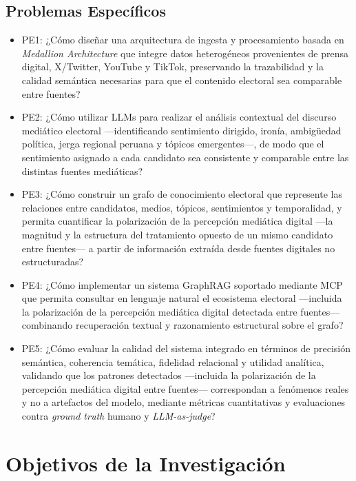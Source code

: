 \subsection{Problemas Específicos}

\newcommand{\Pbone}{¿Cómo diseñar una arquitectura de ingesta y procesamiento basada en \textit{Medallion Architecture} que integre datos heterogéneos provenientes de prensa digital, X/Twitter, YouTube y TikTok, preservando la trazabilidad y la calidad semántica necesarias para que el contenido electoral sea comparable entre fuentes?}
\newcommand{\Pbtwo}{¿Cómo utilizar LLMs para realizar el análisis contextual del discurso mediático electoral —identificando sentimiento dirigido, ironía, ambigüedad política, jerga regional peruana y tópicos emergentes—, de modo que el sentimiento asignado a cada candidato sea consistente y comparable entre las distintas fuentes mediáticas?}
\newcommand{\Pbthree}{¿Cómo construir un grafo de conocimiento electoral que represente las relaciones entre candidatos, medios, tópicos, sentimientos y temporalidad, y permita cuantificar la polarización de la percepción mediática digital —la magnitud y la estructura del tratamiento opuesto de un mismo candidato entre fuentes— a partir de información extraída desde fuentes digitales no estructuradas?}
\newcommand{\Pbfour}{¿Cómo implementar un sistema GraphRAG soportado mediante MCP que permita consultar en lenguaje natural el ecosistema electoral —incluida la polarización de la percepción mediática digital detectada entre fuentes— combinando recuperación textual y razonamiento estructural sobre el grafo?}
\newcommand{\Pbfive}{¿Cómo evaluar la calidad del sistema integrado en términos de precisión semántica, coherencia temática, fidelidad relacional y utilidad analítica, validando que los patrones detectados —incluida la polarización de la percepción mediática digital entre fuentes— correspondan a fenómenos reales y no a artefactos del modelo, mediante métricas cuantitativas y evaluaciones contra \textit{ground truth} humano y \textit{LLM-as-judge}?}

\begin{itemize}
	\item PE1: {\Pbone}
	\item PE2: {\Pbtwo}
	\item PE3: {\Pbthree}
	\item PE4: {\Pbfour}
	\item PE5: {\Pbfive}
\end{itemize}


\section{Objetivos de la Investigación}

